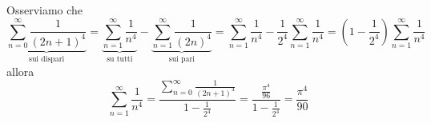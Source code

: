 Osserviamo che
\begin{equation*}
\underbrace{\sum\limits ^{\infty }_{n = 0}\frac{1}{(2n + 1)^{4}}}_{\text{sui dispari}} = \underbrace{\sum\limits ^{\infty }_{n = 1}\frac{1}{n^{4}}}_{\text{su tutti}} - \underbrace{\sum\limits ^{\infty }_{n = 1}\frac{1}{(2n)^{4}}}_{\text{sui pari}} = \sum\limits ^{\infty }_{n = 1}\frac{1}{n^{4}} - \frac{1}{2^{4}}\sum\limits ^{\infty }_{n = 1}\frac{1}{n^{4}} = \left(1 - \frac{1}{2^{4}}\right)\sum\limits ^{\infty }_{n = 1}\frac{1}{n^{4}}
\end{equation*}
allora
\begin{equation*}
\sum\limits ^{\infty }_{n = 1}\frac{1}{n^{4}} = \frac{\sum\limits ^{\infty }_{n = 0}\frac{1}{(2n + 1)^{4}}}{1 - \frac{1}{2^{4}}} = \frac{\frac{\pi ^{4}}{96}}{1 - \frac{1}{2^{4}}} = \frac{\pi ^{4}}{90}
\end{equation*}
\Soluzione

